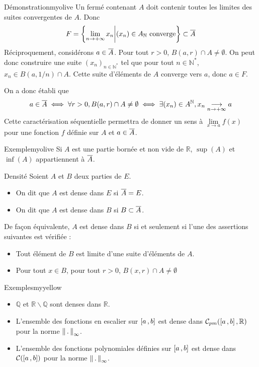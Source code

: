     \begin{demo}{Démonstration}{myolive}
        Un fermé contenant $A$ doit contenir toutes les limites des suites convergentes de $A$. Donc 
        \[ F = \left\{\lim\limits_{n \rightarrow +\infty} x_n \middle| (x_n) \in A_{\mathbb{N}} \text{ converge}\right\} \subset \overline{A} \] 
        Réciproquement, considérons $a \in \overline{A}$. Pour tout $r > 0$, $B(a,r) \cap A \neq \emptyset$. On peut donc construire une suite $(x_n)_{n \in \mathbb{N}^*}$ tel que pour tout $n \in \mathbb{N}^*$, $x_n \in B(a,1/n) \cap A$. Cette suite d’éléments de $A$ converge vers $a$, donc $a \in F$.
    \end{demo}

    On a donc établi que 
    \[ a \in \overline{A} \iff \forall r > 0, B(a,r) \cap A \neq \emptyset \iff \exists (x_n) \in A^{\mathbb{N}}, x_n \underset{n \rightarrow +\infty}{\longrightarrow} a \] 
    Cette caractérisation séquentielle permettra de donner un sens à $\lim\limits_{x \rightarrow a} f(x)$ pour une fonction $f$ définie sur $A$ et $a \in \overline{A}$.

    \begin{omed}{Exemple}{myolive}
        Si $A$ est une partie bornée et non vide de $\mathbb{R}$, $\sup(A)$ et $\inf(A)$ appartiennent à $\overline{A}$.
    \end{omed}

    \begin{defi}{Densité}{}
        Soient $A$ et $B$ deux parties de $E$.
        \begin{itemize}
            \item On dit que $A$ est dense dans $E$ si $\overline{A} = E$.
            \item On dit que $A$ est dense dans $B$ si $B \subset \overline{A}$.
        \end{itemize}
    \end{defi}

    De façon équivalente, $A$ est dense dans $B$ si et seulement si l’une des assertions suivantes est vérifiée : 
    \begin{itemize}
        \item Tout élément de $B$ est limite d’une suite d’éléments de $A$.
        \item Pour tout $x \in B$, pour tout $r > 0$, $B(x,r) \cap A \neq \emptyset$
    \end{itemize}

    \begin{omed}{Exemples}{myyellow}
        \begin{itemize}
            \item $\mathbb{Q}$ et $\mathbb{R} \backslash \mathbb{Q}$ sont denses dans $\mathbb{R}$.
            \item L’ensemble des fonctions en escalier sur $\left[ a \, , b \right]$ est dense dans $\mathcal{C}_{pm}(\left[ a \, , b \right],\mathbb{R})$ pour la norme $\left\lVert\,.\,\right\rVert_{\infty}$.
            \item L’ensemble des fonctions polynomiales définies sur $\left[ a \, , b \right]$ est dense dans $\mathcal{C}(\left[ a \, , b \right])$ pour la norme $\left\lVert\,.\,\right\rVert_{\infty}$.
        \end{itemize}
    \end{omed}


